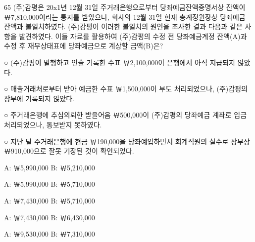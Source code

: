 \begin{question}{65}
(주)감평은 20x1년 12월 31일 주거래은행으로부터 당좌예금잔액증명서상 잔액이 ￦7,810,000이라는 통지를 받았으나, 회사의 12월 31일 현재 총계정원장상 당좌예금 잔액과 불일치하였다. (주)감평이 이러한 불일치의 원인을 조사한 결과 다음과 같은 사항을 발견하였다. 이들 자료를 활용하여 (주)감평의 수정 전 당좌예금계정 잔액(A)과 수정 후 재무상태표에 당좌예금으로 계상할 금액(B)은?
\begin{framedtext}
○ (주)감평이 발행하고 인출 기록한 수표 ￦2,100,000이 은행에서 아직 지급되지 않았다. \par
○ 매출거래처로부터 받아 예금한 수표 ￦1,500,000이 부도 처리되었으나, (주)감평의 장부에 기록되지 않았다. \par
○ 주거래은행에 추심의뢰한 받을어음 ￦500,000이 (주)감평의 당좌예금 계좌로 입금 처리되었으나, 통보받지 못하였다. \par
○ 지난 달 주거래은행에 현금 ￦190,000을 당좌예입하면서 회계직원의 실수로 장부상 ￦910,000으로 잘못 기장된 것이 확인되었다. \par
\end{framedtext}
\begin{choices}
  \item A: ￦5,990,000 B: ￦5,210,000
  \item A: ￦5,990,000 B: ￦5,710,000
  \item A: ￦7,430,000 B: ￦5,710,000
  \item A: ￦7,430,000 B: ￦6,430,000
  \item A: ￦9,530,000 B: ￦7,310,000
\end{choices}
\end{question}
